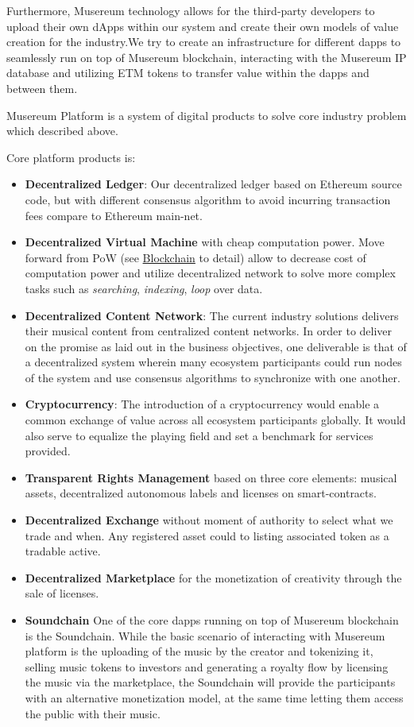 \documentclass[12pt]{report}
\begin{document}
Furthermore, Musereum technology allows for the third-party developers to upload their own dApps within our system and create their own models of value creation for the industry.We try to create an infrastructure for different dapps to seamlessly run on top of Musereum blockchain, interacting with the Musereum IP database and utilizing ETM tokens to transfer value within the dapps and between them.

Musereum Platform is a system of digital products to solve core industry problem which described above.

Core platform products is:
\begin{itemize}
	\item \textbf{Decentralized Ledger}: Our decentralized ledger based on Ethereum source code, but with different consensus algorithm to avoid incurring transaction fees compare to Ethereum main-net.
	\item \textbf{Decentralized Virtual Machine} with cheap computation power. Move forward from PoW (see \hyperref[tech-blockchain]{Blockchain} to detail) allow to decrease cost of computation power and utilize decentralized network to solve more complex tasks such as \textit{searching}, \textit{indexing}, \textit{loop} over data.
	\item \textbf{Decentralized Content Network}: The current industry solutions  delivers their musical content from centralized content networks. In order to deliver on the promise as laid out in the business objectives, one deliverable is that of a decentralized system wherein many ecosystem participants could run nodes of the system and use consensus algorithms to synchronize
with one another.
	\item \textbf{Cryptocurrency}: The introduction of a cryptocurrency would enable a common exchange of value across all ecosystem participants globally. It would also serve to equalize the playing field and set a benchmark for services provided.
	\item \textbf{Transparent Rights Management} based on three core elements: musical assets, decentralized autonomous labels and licenses on smart-contracts.
	\item \textbf{Decentralized Exchange} without moment of authority to select what we trade and when. Any registered asset could to listing associated token as a tradable active.
	\item \textbf{Decentralized Marketplace} for the monetization of creativity through the sale of licenses.
	\item \textbf{Soundchain} One of the core dapps running on top of Musereum blockchain is the Soundchain. While the basic scenario of interacting with Musereum platform is the uploading of the music by the creator and tokenizing it, selling music tokens to investors and generating a royalty flow by licensing the music via the marketplace, the Soundchain will provide the participants with an alternative monetization model, at the same time letting them access the public with their music.
 

\end{itemize}
\end{document}
